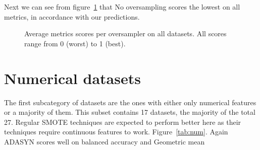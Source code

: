 Next we can see from figure~\ref{fig:Total} that No oversampling scores the lowest on all metrics, in accordance with our predictions. 

\begin{figure}[htp]
\centering
    \quad
    
    \medskip
     \quad
    
    \medskip
    \quad
    
\caption{Average metrics scores per oversampler on all datasets. All scores range from 0 (worst) to 1 (best).}
\label{fig:Total}
\end{figure}

\section{Numerical datasets}
The first subcategory of datasets are the ones with either only numerical features or a majority of them. This subset contains 17 datasets, the majority of the total 27. Regular SMOTE techniques are expected to perform better here as their techniques require continuous features to work. Figure~\ref{tab:num}. Again ADASYN scores well on balanced accuracy and Geometric mean 

